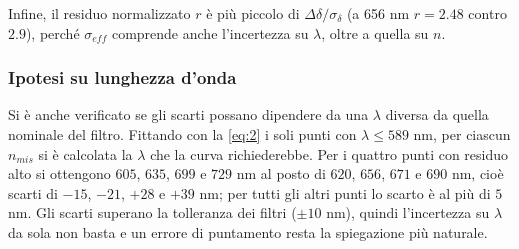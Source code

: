 \documentclass[10pt,twocolumn]{article}
\begin{document}
\begin{table}[H]
      \centering
      \label{tab:tacche}
      \small
      \caption{Punti con $|r|>1$ rispetto al fit di Sellmeier completo ($r$ = residuo normalizzato). }
    \end{table}
    \noindent Infine, il residuo normalizzato $r$ è più piccolo di $\Delta\delta/\sigma_\delta$ (a 656 nm $r=2.48$ contro $2.9$), perché $\sigma_{eff}$ comprende anche l'incertezza su $\lambda$, oltre a quella su $n$.


    \subsubsection{Ipotesi su lunghezza d'onda}
    Si è anche verificato se gli scarti possano dipendere da una $\lambda$ diversa da quella nominale del filtro. Fittando con la \eqref{eq:2} i soli punti con $\lambda\le589$ nm, per ciascun $n_{mis}$ si è calcolata la $\lambda$ che la curva richiederebbe. Per i quattro punti con residuo alto si ottengono $605$, $635$, $699$ e $729$ nm al posto di $620$, $656$, $671$ e $690$ nm, cioè scarti di $-15$, $-21$, $+28$ e $+39$ nm; per tutti gli altri punti lo scarto è al più di $5$ nm. Gli scarti superano la tolleranza dei filtri ($\pm10$ nm), quindi l'incertezza su $\lambda$ da sola non basta e un errore di puntamento resta la spiegazione più naturale.
\end{document}
